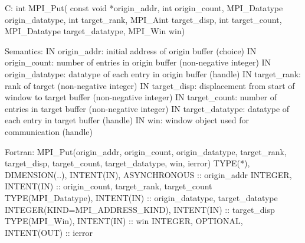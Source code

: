 C:
int MPI_Put(
  const void *origin_addr, int origin_count, MPI_Datatype origin_datatype,
  int target_rank, MPI_Aint target_disp, int target_count, MPI_Datatype target_datatype,
  MPI_Win win)

Semantics:
IN origin_addr: initial address of origin buffer (choice)
IN origin_count: number of entries in origin buffer (non-negative integer)
IN origin_datatype: datatype of each entry in origin buffer (handle)
IN target_rank: rank of target (non-negative integer)
IN target_disp: displacement from start of window to target buffer (non-negative integer)
IN target_count: number of entries in target buffer (non-negative integer)
IN target_datatype: datatype of each entry in target buffer (handle)
IN win: window object used for communication (handle)

Fortran:
MPI_Put(origin_addr, origin_count, origin_datatype,
  target_rank, target_disp, target_count, target_datatype, win, ierror)
TYPE(*), DIMENSION(..), INTENT(IN), ASYNCHRONOUS :: origin_addr
INTEGER, INTENT(IN) :: origin_count, target_rank, target_count
TYPE(MPI_Datatype), INTENT(IN) :: origin_datatype, target_datatype
INTEGER(KIND=MPI_ADDRESS_KIND), INTENT(IN) :: target_disp
TYPE(MPI_Win), INTENT(IN) :: win
INTEGER, OPTIONAL, INTENT(OUT) :: ierror

